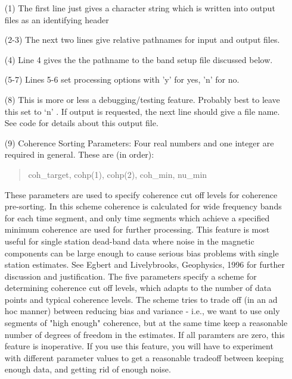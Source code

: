 \begin{itemize}
\item[(1)]
The first line just gives a character string which is written into
output files as an identifying header

\item[(2-3)]
The next two lines give relative pathnames for input and output files.

\item[(4)]
Line 4 gives the the pathname to the band setup file discussed below.

\item[(5-7)]
Lines 5-6 set processing options with 'y' for yes, 'n' for no.


\item[(8)]
This is more or less a debugging/testing feature.  Probably
best to leave this set to `n' .  If output is requested, the next line should give
a file name.  See code for details about this output file.

\item[(9)]
Coherence Sorting Parameters:
Four real numbers and one integer are required in general.  These
are (in order):
\begin{quote}
       coh\_target, cohp(1), cohp(2), coh\_min, nu\_min
\end{quote}

These parameters are used to specify coherence cut off levels for
coherence pre-sorting.  In this scheme coherence is calculated
for wide frequency bands for each time segment, and only time
segments which achieve a specified minimum coherence are used
for further processing.  This feature is most useful for single 
station dead-band data where noise in
the magnetic components can be large enough to cause serious
bias problems with single station estimates.
See Egbert and Livelybrooks, Geophysics, 1996 for further
discussion and justification.
The five parameters specify a scheme for determining coherence
cut off levels, which adapts to the number of data points and
typical coherence levels.  The scheme tries to trade off
(in an ad hoc manner) between reducing bias and variance -
i.e., we want to use only segments of "high enough" coherence,
but at the same time keep a reasonable number of degrees of 
freedom in the estimates.
If all paramters are zero, this feature is inoperative.
If you use this feature, you will have to experiment with different
parameter values to get a reasonable tradeoff between keeping 
enough data, and getting rid of enough noise.
\end{itemize}

